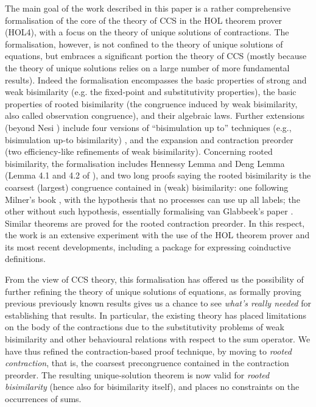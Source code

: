 The main goal of the work described in this paper is a rather
comprehensive formalisation of the core of the theory of CCS in the HOL
theorem prover (HOL4),  with a focus on the theory of unique solutions of contractions.
The formalisation, however, is not confined to the theory of unique
solutions of equations, but embraces a significant portion the theory of CCS \cite{Mil89}
(mostly because the theory of unique solutions relies on a large number of more fundamental results).
Indeed the formalisation encompasses the basic properties of strong and weak
bisimilarity (e.g. the fixed-point and substitutivity properties), the
basic properties of
rooted bisimilarity (the congruence induced by weak
bisimilarity, also called observation congruence), and
their algebraic laws. Further extensions (beyond Nesi
\cite{Nesi:1992ve}) include four versions of ``bisimulation up to''
techniques (e.g., bisimulation up-to bisimilarity) \cite{Mil89,sangiorgi1992problem}, and the
expansion and contraction preorder (two
efficiency-like refinements of weak bisimilarity). Concerning rooted bisimilarity, the formalisation
includes Hennessy Lemma and Deng Lemma (Lemma 4.1 and 4.2 of
\cite{Gorrieri:2015jt}),
 and two long proofs saying the rooted bisimilarity is the coarsest (largest)
 congruence contained in (weak) bisimilarity: one following Milner's
 book \cite{Mil89}, with the hypothesis that no processes can use up
 all labels;
the other without such hypothesis, essentially formalising van Glabbeek's paper \cite{van2005characterisation}.
Similar theorems are proved for the rooted contraction preorder.
In this respect, the work is an extensive experiment with the use of the HOL theorem prover and its
most recent developments, including a package for expressing coinductive definitions.

From the view of CCS theory, this formalisation has offered us the possibility of
further refining the theory of unique solutions of
equations, as formally proving previous previously known results gives us a
chance to see \emph{what's really needed} for establishing that results.
In particular, the existing theory has placed limitations on the body of the contractions due to the
substitutivity problems of weak bisimilarity and other behavioural relations with respect
to the sum operator.
We have thus refined the contraction-based proof technique, by moving to  
\emph{rooted contraction}, that is, the coarsest precongruence contained in the contraction
preorder. The resulting unique-solution theorem is now valid for
\emph{rooted bisimilarity} (hence also for bisimilarity itself), and places no 
constraints on the occurrences of sums.

